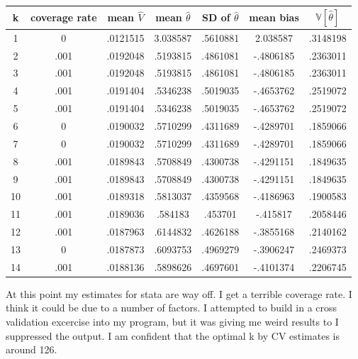 \documentclass[12pt]{article}
\newcommand{\V}{\mathbb{V}}
\begin{document}
\center
\begin{tabular}{|c|c|c|c|c|c|c||}
\hline
k   &   coverage rate   &   mean $\hat{V}$   &  mean $\hat{\theta}$     &   SD of $\hat{\theta}$  &   mean bias   &   $\V[\hat{\theta}]$  \\
\hline
1   &   0   &   .0121515   &   3.038587   &   .5610881   &   2.038587   &   .3148198 \\
2   &   .001   &   .0192048   &   .5193815   &   .4861081   &   -.4806185   &   .2363011 \\
3   &   .001   &   .0192048   &   .5193815   &   .4861081   &   -.4806185   &   .2363011 \\
4   &   .001   &   .0191404   &   .5346238   &   .5019035   &   -.4653762   &   .2519072 \\
5   &   .001   &   .0191404   &   .5346238   &   .5019035   &   -.4653762   &   .2519072 \\
6   &   0   &   .0190032   &   .5710299   &   .4311689   &   -.4289701   &   .1859066 \\
7   &   0   &   .0190032   &   .5710299   &   .4311689   &   -.4289701   &   .1859066 \\
8   &   .001   &   .0189843   &   .5708849   &   .4300738   &   -.4291151   &   .1849635 \\
9   &   .001   &   .0189843   &   .5708849   &   .4300738   &   -.4291151   &   .1849635 \\
10   &   .001   &   .0189318   &   .5813037   &   .4359568   &   -.4186963   &   .1900583 \\
11   &   .001   &   .0189036   &   .584183   &   .453701   &   -.415817   &   .2058446 \\
12   &   .001   &   .0187963   &   .6144832   &   .4626188   &   -.3855168   &   .2140162 \\
13   &   0   &   .0187873   &   .6093753   &   .4969279   &   -.3906247   &   .2469373 \\
14   &   .001   &   .0188136   &   .5898626   &   .4697601   &   -.4101374   &   .2206745 \\
\hline
\hline
\end{tabular}

At this point my estimates for stata are way off. I get a terrible coverage rate. I think it could be due to a number of factors. I attempted to build in a cross validation excercise into my program, but it was giving me weird results to I suppressed the output. I am confident that the optimal k by CV estimates is around 126. 
\end{document}
